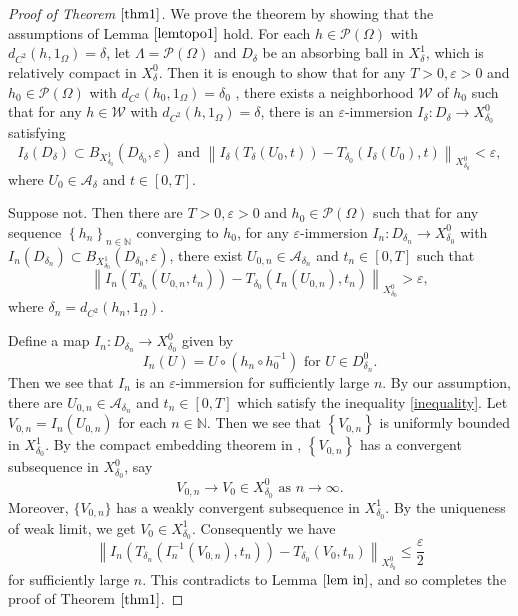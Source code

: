 \documentclass[11pt]{amsart}
\begin{document}
\begin{proof}[Proof of Theorem $\ref{thm1}$]
    We prove the theorem by showing that the assumptions of Lemma $\ref{lemtopo1}$ hold. For each $h\in \mathcal P(\Omega)$ with $d_{C^2}(h,1_\Omega)=\delta$, let $\Lambda = \mathcal P(\Omega)$ and $D_\delta$ be an absorbing ball in $X^1_\delta$, which is relatively compact in $X^0_\delta$. Then it is enough to show that for any $T > 0, \varepsilon > 0$ and $h_0 \in  \mathcal P(\Omega)$ with $d_{C^2}(h_0,1_\Omega)=\delta_0$ , there exists a neighborhood $\mathcal{W}$ of $h_{0}$ such that for any $h \in \mathcal{W}$ with $d_{C^2}(h,1_\Omega)=\delta$, there is an $\varepsilon$-immersion $I_\delta: D_{\delta} \rightarrow X^0_{\delta_0}$ satisfying
$$
 I_\delta \left(D_{\delta}\right) \subset B_{X^1_{\delta_0}}(D_{\delta_{0}}, \varepsilon) \text { and } 
\left\|I_\delta \left(T_{\delta}\left(U_{0}, t\right)\right)-T_{\delta_{0}}\left(I_\delta\left(U_{0}\right), t\right)\right\|_{X^0_{\delta_{0}}}<\varepsilon,
$$
where $U_{0} \in \mathcal{A}_{\delta}$ and $t \in[0, T]$.

Suppose not. Then there are $T>0, \varepsilon>0$ and $h_0 \in \mathcal P(\Omega)$ such that for any sequence $\left\{h_{n}\right\}_{n \in \mathbb{N}}$ converging to $h_{0}$, for any $\varepsilon$-immersion $I_{n}: D_{\delta_{n}} \rightarrow X^0_{\delta_{0}}$ with  $I_{n}\left(D_{\delta_{n}}\right) \subset B_{X^1_{\delta_0}}\left(D_{\delta_{0}}, \varepsilon\right)$, there exist $U_{0,n} \in \mathcal{A}_{\delta_{n}}$ and $t_{n} \in[0, T]$ such that
\begin{equation}\label{inequality}
\left\|I_{n}\left(T_{\delta_n}\left(U_{0,n}, t_{n}\right)\right)-T_{\delta_{0}}\left(I_{n}\left(U_{0,n}\right), t_{n}\right)\right\|_{X^0_{\delta_{0}}}>\varepsilon,
\end{equation}
where $\delta_n =d_{C^2}(h_n, 1_\Omega)$.


Define a map  $I_{n}: D_{\delta_{n}} \rightarrow X^0_{\delta_{0}}$ given by
$$
I_n(U) =U \circ (h_n \circ h_0^{-1}) \text{ for } U \in D_{\delta_n}^0.
$$
Then we see that $I_n$ is an $\varepsilon$-immersion for sufficiently large $n$. 
By our assumption, there are $U_{0,n} \in \mathcal{A}_{\delta_{n}}$ and $t_{n} \in[0, T]$ which satisfy the inequality \eqref{inequality}. Let $V_{0,n}=I_{n}\left(U_{0,n}\right)$ for each $n \in \mathbb{N}$. Then we see that $\left\{V_{0,n}\right\}$ is uniformly bounded in $X^1_{\delta_{0}}$. By the compact embedding theorem in \cite{Rb}, $\left\{V_{0,n}\right\}$ has a convergent subsequence in $X^0_{\delta_{0}}$, say
$$
V_{0,n} \rightarrow V_{0} \in X^0_{\delta_{0}} \text { as } n \rightarrow \infty.$$
Moreover, $\{V_{0,n}\}$ has a weakly convergent subsequence in $X^1_{\delta_0}$. By the uniqueness of weak limit, we get $V_0\in X^1_{\delta_0}.$
Consequently we have
$$
\left\|I_{n}\left(T_{\delta_{n}}\left(I_{n}^{-1}\left(V_{0,n}\right), t_{n}\right)\right)-T_{\delta_{0}}\left(V_{0}, t_{n}\right)\right\|_{X^0_{\delta_{0}}} \leq \frac{\varepsilon}{2}
$$
for  sufficiently large $n$. This contradicts to  Lemma $\ref{lem in}$, and so completes the proof of Theorem $\ref{thm1}$.
\end{proof}
\end{document}

